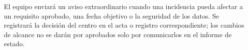 El equipo enviará un aviso extraordinario cuando una incidencia pueda afectar a un requisito aprobado, una fecha objetivo o la seguridad de los datos. Se registrará la decisión del centro en el acta o registro correspondiente; los cambios de alcance no se darán por aprobados solo por comunicarlos en el informe de estado.